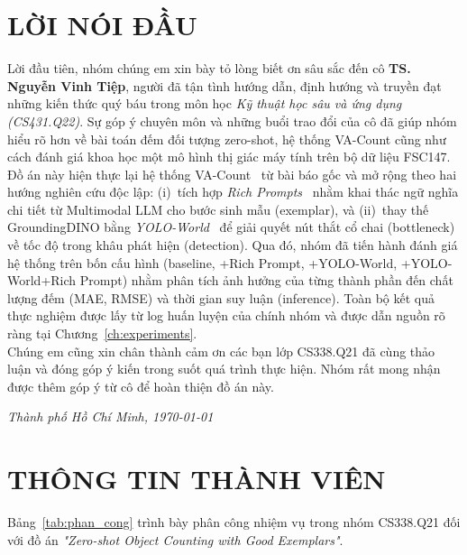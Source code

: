 \documentclass[a4paper,12pt]{report}
\numberwithin{figure}{chapter}
\numberwithin{table}{chapter}
\begin{document}
\chapter*{LỜI NÓI ĐẦU}

Lời đầu tiên, nhóm chúng em xin bày tỏ lòng biết ơn sâu sắc đến cô \textbf{TS. Nguyễn Vinh Tiệp}, người đã tận tình hướng dẫn, định hướng và truyền đạt những kiến thức quý báu trong môn học \textit{Kỹ thuật học sâu và ứng dụng (CS431.Q22)}. Sự góp ý chuyên môn và những buổi trao đổi của cô đã giúp nhóm hiểu rõ hơn về bài toán đếm đối tượng zero-shot, hệ thống VA-Count cũng như cách đánh giá khoa học một mô hình thị giác máy tính trên bộ dữ liệu FSC147.\\[1em]
Đồ án này hiện thực lại hệ thống VA-Count~\cite{vacount} từ bài báo gốc và mở rộng theo hai hướng nghiên cứu độc lập: (i)~tích hợp \textit{Rich Prompts}~\cite{richprompts} nhằm khai thác ngữ nghĩa chi tiết từ Multimodal LLM cho bước sinh mẫu (exemplar), và (ii)~thay thế GroundingDINO bằng \textit{YOLO-World}~\cite{yoloworld} để giải quyết nút thắt cổ chai (bottleneck) về tốc độ trong khâu phát hiện (detection). Qua đó, nhóm đã tiến hành đánh giá hệ thống trên bốn cấu hình (baseline, +Rich Prompt, +YOLO-World, +YOLO-World+Rich Prompt) nhằm phân tích ảnh hưởng của từng thành phần đến chất lượng đếm (MAE, RMSE) và thời gian suy luận (inference). Toàn bộ kết quả thực nghiệm được lấy từ log huấn luyện của chính nhóm và được dẫn nguồn rõ ràng tại Chương~\ref{ch:experiments}.\\[1em]
Chúng em cũng xin chân thành cảm ơn các bạn lớp CS338.Q21 đã cùng thảo luận và đóng góp ý kiến trong suốt quá trình thực hiện. Nhóm rất mong nhận được thêm góp ý từ cô để hoàn thiện đồ án này.\\[1em]
\begin{flushright}
\textit{Thành phố Hồ Chí Minh, \today}
\end{flushright}

\chapter*{THÔNG TIN THÀNH VIÊN}

Bảng~\ref{tab:phan_cong} trình bày phân công nhiệm vụ trong nhóm CS338.Q21 đối với đồ án \textit{"Zero-shot Object Counting with Good Exemplars"}.
\end{document}
